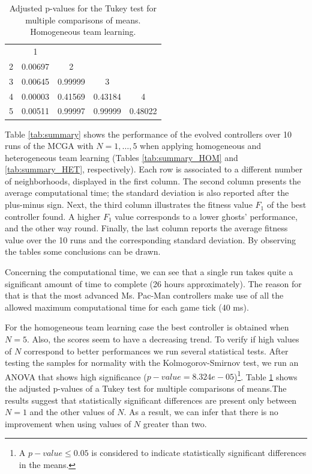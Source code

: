 \documentclass[journal]{IEEEtran}
\begin{document}
\begin{table} [!t]
\caption{Adjusted p-values for the Tukey test for multiple comparisons of means. Homogeneous team learning.}
\label{tab:tukey}
\begin{tabular}{c|c|c|cc}
\multicolumn{1}{c}{} & \multicolumn{1}{c}{1} & \multicolumn{1}{c}{} &  & \tabularnewline
\cline{2-2} 
2 & 0.00697 & \multicolumn{1}{c}{2} &  & \tabularnewline
\cline{2-3} 
3 & 0.00645 & 0.99999 & 3 & \tabularnewline
\cline{2-4} 
4 & 0.00003 & 0.41569 & \multicolumn{1}{c|}{0.43184} & 4\tabularnewline
\cline{2-5} 
5 & 0.00511 & 0.99997 & \multicolumn{1}{c|}{0.99999} & \multicolumn{1}{c|}{0.48022}\tabularnewline
\cline{2-5} 
\end{tabular}
\end{table}

Table \ref{tab:summary} shows the performance of the evolved controllers over 10 runs of the MCGA with $N=1,\ldots,5$ when applying homogeneous and heterogeneous team learning (Tables \ref{tab:summary_HOM} and \ref{tab:summary_HET}, respectively). Each row is associated to a different number of neighborhoods, displayed in the first column. The second column presents the average computational time; the standard deviation is also reported after the plus-minus sign. Next, the third column illustrates the fitness value $F_1$ of the best controller found. A higher $F_1$ value corresponds to a lower ghosts' performance, and the other way round. Finally, the last column reports the average fitness value over the 10 runs and the corresponding standard deviation. By observing the tables some conclusions can be drawn.

Concerning the computational time, we can see that a single run takes
quite a significant amount of time to complete (26 hours
approximately). The reason for that is that the most advanced
Ms. Pac-Man controllers make use of all the allowed maximum
computational time for each game tick (40 ms). 

For the homogeneous team learning case the best controller is obtained
when $N=5$. Also, the scores seem to have a decreasing trend. To verify if high values of $N$ correspond to better performances we run several statistical tests. After testing the samples for normality with the Kolmogorov-Smirnov test, we run an ANOVA that shows high significance ($p-value=8.324e-05$)\footnote{A $p-value\leq0.05$ is considered to indicate statistically significant differences in the means.}. Table \ref{tab:tukey} shows the adjusted p-values of a Tukey test for multiple comparisons of means.The results suggest that statistically significant differences are present only between $N=1$ and the other values of $N$. As a result, we can infer that there is no improvement when using values of $N$ greater than two.
\end{document}
